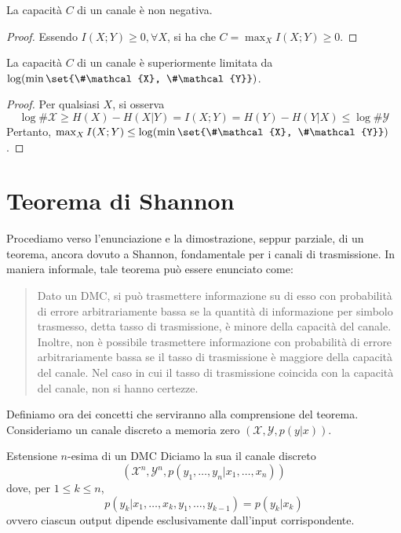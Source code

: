 \begin{proposition}{}
  La capacità \(C\) di un canale è non negativa.
\end{proposition}
\begin{proof}
  Essendo \(I(X;Y) \geq 0, \forall X\), si ha che \(C = \max_X I(X;Y) \geq 0\).
\end{proof}

\begin{proposition}{}
  La capacità \(C\) di un canale è superiormente limitata da \(\log(\min\set{\#\mathcal{X}, \#\mathcal{Y}})\).
\end{proposition}
\begin{proof}
  Per qualsiasi $X$, si osserva \[\log{\#\mathcal{X}} \geq H(X)-H(X|Y)=I(X;Y)=H(Y)-H(Y|X) \leq \log{\#\mathcal{Y}}\]
  Pertanto, $\max_X I(X;Y) \leq \log(\min\set{\#\mathcal{X}, \#\mathcal{Y}})$.
\end{proof}

\section{Teorema di Shannon}
Procediamo verso l'enunciazione e la dimostrazione, seppur parziale, di un teorema, ancora dovuto a Shannon, fondamentale per i canali di trasmissione. In maniera informale, tale teorema può essere enunciato come:

\begin{quote}
  Dato un DMC, si può trasmettere informazione su di esso con probabilità di errore arbitrariamente bassa se la quantità di informazione per simbolo trasmesso, detta tasso di trasmissione, è minore della capacità del canale.
  Inoltre, non è possibile trasmettere informazione con probabilità di errore arbitrariamente bassa se il tasso di trasmissione è maggiore della capacità del canale.
  Nel caso in cui il tasso di trasmissione coincida con la capacità del canale, non si hanno certezze.
\end{quote}

Definiamo ora dei concetti che serviranno alla comprensione del teorema. Consideriamo un canale discreto a memoria zero \((\mathcal{X}, \mathcal{Y}, p(y|x))\).

\begin{definition}{Estensione \(n\)-esima di un DMC}
  Diciamo la sua  il canale discreto 
  \[(\mathcal{X}^n, \mathcal{Y}^n, p(y_1,\ldots,y_n|x_1,\ldots,x_n))\]
  dove, per \(1\leq k\leq n\),
  \[p(y_k|x_1, \ldots,x_k,y_1,\ldots,y_{k-1}) = p(y_k|x_k)\] 
  ovvero ciascun output dipende esclusivamente dall'input corrispondente.
\end{definition}

